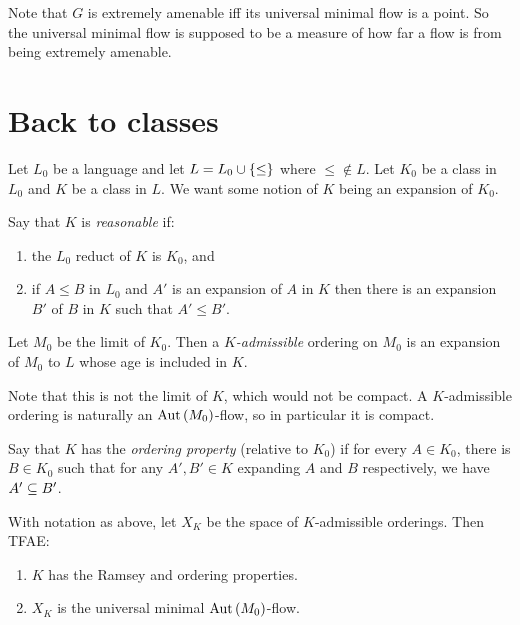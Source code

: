 \documentclass{amsart}
\begin{document}
Note that $G$ is extremely amenable iff its universal minimal flow is a point.
So the universal minimal flow is supposed to be a measure of how far a flow is from being
extremely amenable.

\section{Back to \Fraisse classes}

Let $L_0$ be a language and let $L = L_0\cup \left\{ \leq \right\}$ where $\leq \not\in L$.
Let $K_0$ be a \Fraisse class in $L_0$ and $K$ be a \Fraisse class in $L$.
We want some notion of $K$ being an expansion of $K_0$.

\begin{defn}
Say that $K$ is \emph{reasonable} if:
\begin{enumerate}
\item the $L_0$ reduct of $K$ is $K_0$, and
\item if $A\leq B$ in $L_0$ and $A'$ is an expansion of $A$ in $K$ then there is an
expansion $B'$ of $B$ in $K$ such that $A'\leq B'$.
\end{enumerate}
\end{defn}

\begin{defn}
Let $M_0$ be the \Fraisse limit of $K_0$. Then a \emph{$K$-admissible} ordering on $M_0$
is an expansion of $M_0$ to $L$ whose age is included in $K$.
\end{defn}

Note that this is not the \Fraisse limit of $K$, which would not be compact. 
A $K$-admissible ordering is naturally an $\operatorname{Aut}\left( M_0 \right)$-flow, so in particular
it is compact. 

\begin{defn}
Say that $K$ has the \emph{ordering property} (relative to $K_0$) if for every $A\in
K_0$, there is $B\in K_0$ such that for any $A',B'\in K$ expanding $A$ and $B$
respectively, we have $A'\subseteq B'$.
\end{defn}

\begin{thm}[KPT]
With notation as above, let $X_K$ be the space of $K$-admissible orderings. Then TFAE:
\begin{enumerate}[label=(\iii)]
\item $K$ has the Ramsey and ordering properties.
\item $X_K$ is the universal minimal $\operatorname{Aut}\left( M_0 \right)$-flow.
\end{enumerate}
\end{thm}
\end{document}
